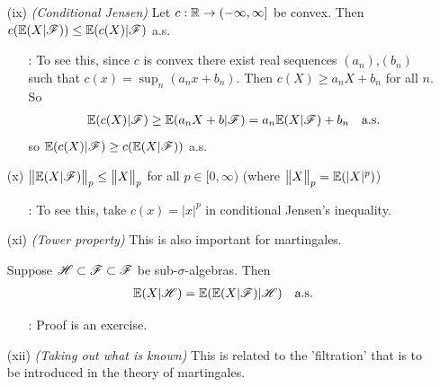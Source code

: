 \documentclass[12pt,a4paper]{report}
\begin{document}
\begin{itemize}
\item[(ix)] \emph{(Conditional Jensen)} Let $c: \mathbb{R} \rightarrow (-\infty, \infty]$ be convex. Then $c(\mathbb{E}(X|\mathscr{F})) \leq \mathbb{E}( c(X) |\mathscr{F})$ a.s.
\begin{itemize}
\item[:] To see this, since $c$ is convex there exist real sequences $(a_n)$,$(b_n)$ such that $c(x) = \sup_n (a_n x +b_n)$. Then $c(X) \geq a_n X +b_n$ for all $n$. So
\begin{align*}
\mathbb{E}(c(X)|\mathscr{F}) \geq \mathbb{E}(a_n X + b|\mathscr{F}) = a_n \mathbb{E}(X|\mathscr{F}) + b_n \quad \text{a.s.}
\end{align*}
so $\mathbb{E}(c(X)|\mathscr{F}) \geq c(\mathbb{E}(X|\mathscr{F}))$ a.s.
\end{itemize}
\item[(x)] $\bigl\lVert\mathbb{E}(X|\mathscr{F})\bigr\rVert_{p}\leq \bigl\lVert X\bigr\rVert_{p}$ for all $p\in [0,\infty)$ (where $\bigl\lVert X\bigr\rVert_{p} = \mathbb{E}(|X|^p)$)
\begin{itemize}
\item[:] To see this, take $c(x) = |x|^p$ in conditional Jensen's inequality.
\end{itemize}
\item[(xi)] \emph{(Tower property)} This is also important for martingales.

Suppose $\mathscr{H} \subset \mathscr{F} \subset \mathscr{F}$ be sub-$\sigma$-algebras. Then
\begin{align*}
\mathbb{E}(X|\mathscr{H}) = \mathbb{E}(\mathbb{E}(X|\mathscr{F})|\mathscr{H}) \quad \text{a.s.}
\end{align*}
\begin{itemize}
\item[:] Proof is an exercise.
\end{itemize}
\item[(xii)] \emph{(Taking out what is known)} This is related to the 'filtration' that is to be introduced in the theory of martingales.


\end{itemize}
\end{document}
